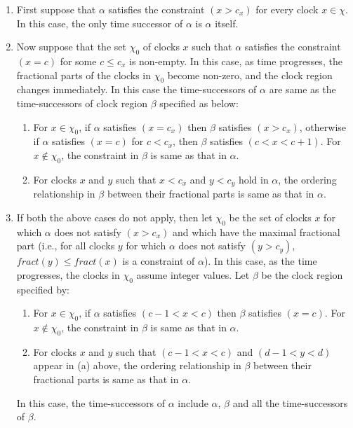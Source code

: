 \begin{enumerate}
\item First suppose that $\alpha$ satisfies the constraint $(x > c_{x})$ for every clock $x \in \chi$. In this case, the only time successor of $\alpha$ is $\alpha$ itself.
\item Now suppose that the set $\chi_{0}$ of clocks $x$ such that $\alpha$ satisfies the constraint $(x = c)$ for some $c \leq c_{x}$ is non-empty. In this case, as time progresses, the fractional parts of the clocks in $\chi_{0}$ become non-zero, and the clock region changes immediately. In this case the time-successors of $\alpha$ are same as the time-successors of clock region $\beta$ specified as below:
\begin{enumerate}
\item For $x \in \chi_{0}$, if $\alpha$ satisfies $(x = c_{x})$ then $\beta$ satisfies $(x > c_{x})$, otherwise if $\alpha$ satisfies $(x = c)$ for $c < c_{x}$, then $\beta$ satisfies $(c < x < c + 1)$. For $x \notin \chi_{0}$, the constraint in $\beta$ is same as that in $\alpha$.
\item For clocks $x$ and $y$ such that $x < c_{x}$ and $y < c_{y}$ hold in $\alpha$, the ordering relationship in $\beta$ between their fractional parts is same as that in $\alpha$.
\end{enumerate}
\item If both the above cases do not apply, then let $\chi_{0}$ be the set of clocks $x$ for which $\alpha$ does not satisfy $(x > c_{x})$ and which have the maximal fractional part (i.e., for all clocks $y$ for which $\alpha$ does not satisfy $(y > c_{y})$, $fract(y) \leq fract(x)$ is a constraint of $\alpha$). In this case, as the time progresses, the clocks in $\chi_{0}$ assume integer values. Let $\beta$ be the clock region specified by:
\begin{enumerate}
\item For $x \in \chi_{0}$, if $\alpha$ satisfies $(c - 1 < x < c)$ then $\beta$ satisfies $(x = c)$. For $x \notin \chi_{0}$, the constraint in $\beta$ is same as that in $\alpha$.
\item For clocks $x$ and $y$ such that $(c - 1 < x < c)$ and $(d - 1 < y < d)$ appear in (a) above, the ordering relationship in $\beta$ between their fractional parts is same as that in $\alpha$.
\end{enumerate}
In this case, the time-successors of $\alpha$ include $\alpha$, $\beta$ and all the time-successors of $\beta$.
\end{enumerate}

